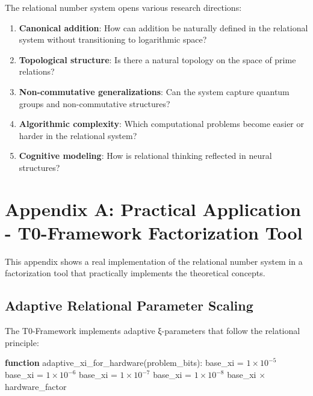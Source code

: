 	The relational number system opens various research directions:
	
	\begin{enumerate}
		\item \textbf{Canonical addition}: How can addition be naturally defined in the relational system without transitioning to logarithmic space?
		\item \textbf{Topological structure}: Is there a natural topology on the space of prime relations?
		\item \textbf{Non-commutative generalizations}: Can the system capture quantum groups and non-commutative structures?
		\item \textbf{Algorithmic complexity}: Which computational problems become easier or harder in the relational system?
		\item \textbf{Cognitive modeling}: How is relational thinking reflected in neural structures?
	\end{enumerate}
	
	\section{Appendix A: Practical Application - T0-Framework Factorization Tool}
	
	This appendix shows a real implementation of the relational number system in a factorization tool that practically implements the theoretical concepts.
	
	\subsection{Adaptive Relational Parameter Scaling}
	
	The T0-Framework implements adaptive ξ-parameters that follow the relational principle:
	
	\begin{algorithm}[htbp]
		\caption{Adaptive $\xi$-Parameters in the Relational System}
		\label{alg:adaptive_xi}
		\begin{algorithmic}[1]
			\STATE \textbf{function} adaptive\_xi\_for\_hardware(problem\_bits):
			\STATE base\_xi = $1 \times 10^{-5}$ 
			\STATE base\_xi = $1 \times 10^{-6}$ 
			\STATE base\_xi = $1 \times 10^{-7}$ 
			\ELSE
			\STATE base\_xi = $1 \times 10^{-8}$ 
			\ENDIF
			\RETURN base\_xi $\times$ hardware\_factor
		\end{algorithmic}
	\end{algorithm}
	
